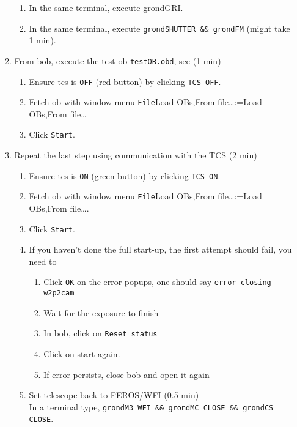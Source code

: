 \documentclass[11pt,fleqn,a4paper]{book}
\makeatletter
\def\menu#1#2{\texttt{#1}\ifx{}#2\else\@for\@x:=#2\do{$\rightarrow$\texttt{\@x}}\fi}
\def\wmenu#1#2{window menu \menu{#1}{#2}}
\makeatother
\begin{document}
\begin{enumerate}
\begin{enumerate}
\begin{enumerate}
             \item In the same terminal, execute \gls{grondGRI}.
             \item In the same terminal, execute \texttt{\gls{grondSHUTTER} \&\& \gls{grondFM}} (might take 1 min).
           \end{enumerate}
         \item From \gls{bob}, execute the test \gls{ob} \texttt{testOB.obd}, see  (1 min)
           \begin{enumerate}
             \item Ensure \gls{tcs} is \texttt{OFF} (red button) by clicking \texttt{TCS OFF}.
             \item Fetch \gls{ob} with \wmenu{File}{Load OBs,From file…} 
             \item Click \texttt{Start}.
           \end{enumerate}
         \item Repeat the last step using communication with the TCS (2 min)\label{list:grond-testtcs}
           \begin{enumerate}
             \item Ensure \gls{tcs} is \texttt{ON} (green button) by clicking \texttt{TCS ON}.
             \item Fetch \gls{ob} with \wmenu{File}{Load OBs,From file…}.
             \item Click \texttt{Start}.
             \item If you haven't done the full start-up, the first attempt should fail, you need to
             \begin{enumerate}
                \item Click \texttt{OK} on the error popups, one should say \texttt{error closing \gls{w2p2cam}}
                \item Wait for the exposure to finish
                \item In \gls{bob}, click on \texttt{Reset status}
                \item Click on start again.
                \item If error persists, close \gls{bob} and open it again
             \end{enumerate} 
             \item Set telescope back to FEROS/WFI (0.5 min)\\
             In a terminal type, \texttt{\gls{grondM3} WFI \&\& \gls{grondMC} CLOSE \&\& \gls{grondCS} CLOSE}.
           \end{enumerate}

\end{enumerate}
\end{enumerate}
\end{document}
